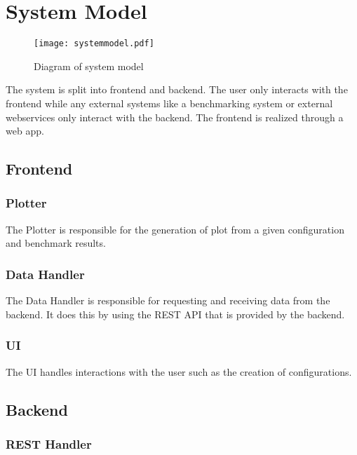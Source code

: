 \section{System Model}

\begin{figure}[H]
    \texttt{[image: systemmodel.pdf]}
    \caption{Diagram of system model}
    \label{fig:systemmodel}
\end{figure}

The system is split into frontend and backend. The \gls{user} only interacts with the frontend while any external systems like a benchmarking system or external webservices only interact with the backend. The frontend is realized through a web app.

\subsection{Frontend}

\subsubsection*{Plotter}

The Plotter is responsible for the generation of \gls{plot} from a given \gls{configuration} and benchmark results. 

\subsubsection*{Data Handler}

The Data Handler is responsible for requesting and receiving data from the backend. It does this by using the \gls{REST API} that is provided by the backend.

\subsubsection*{UI}

The UI handles interactions with the \gls{user} such as the creation of \glspl{configuration}.

\subsection{Backend}

\subsubsection*{REST Handler}

